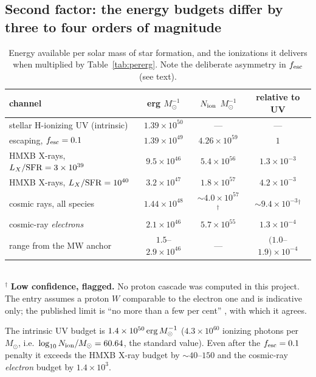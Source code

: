 \documentclass[11pt,a4paper]{article}
\begin{document}
\subsection{Second factor: the energy budgets differ by three to four orders of
magnitude}

\begin{table}[htbp]
\centering
\caption{Energy available per solar mass of star formation, and the
ionizations it delivers when multiplied by Table~\ref{tab:pererg}.
Note the deliberate asymmetry in $f_{\rm esc}$ (see text).}
\label{tab:budget}
\begin{tabular}{lccc}
\toprule
channel & erg $M_\odot^{-1}$ & $N_{\rm ion}$ $M_\odot^{-1}$ & relative to UV \\
\midrule
stellar H-ionizing UV (intrinsic)      & $1.39\times10^{50}$ & --- & --- \\
\quad escaping, $f_{\rm esc}=0.1$      & $1.39\times10^{49}$ & $4.26\times10^{59}$ & $1$ \\
HMXB X-rays, $L_X/{\rm SFR}=3\times10^{39}$ & $9.5\times10^{46}$ & $5.4\times10^{56}$ & $1.3\times10^{-3}$ \\
HMXB X-rays, $L_X/{\rm SFR}=10^{40}$   & $3.2\times10^{47}$ & $1.8\times10^{57}$ & $4.2\times10^{-3}$ \\
cosmic rays, all species               & $1.44\times10^{48}$ & $\sim4.0\times10^{57}$$^{\dagger}$ & $\sim9.4\times10^{-3}$$^{\dagger}$ \\
cosmic-ray \emph{electrons}            & $2.1\times10^{46}$ & $5.7\times10^{55}$ & $1.3\times10^{-4}$ \\
\quad range from the MW anchor         & $1.5$--$2.9\times10^{46}$ & --- & $(1.0$--$1.9)\times10^{-4}$ \\
\bottomrule
\end{tabular}\\[2pt]
{\footnotesize $^{\dagger}$ \textbf{Low confidence, flagged.} No proton cascade
was computed in this project. The entry assumes a proton $W$ comparable to the
electron one and is indicative only; the published limit is ``no more than a
few per cent'' \citep{sazonov15,leite17}, with which it agrees.}
\end{table}

The intrinsic UV budget is $1.4\times10^{50}\,{\rm erg}\,M_\odot^{-1}$
($4.3\times10^{60}$ ionizing photons per $M_\odot$, i.e.\
$\log_{10}N_{\rm ion}/M_\odot = 60.64$, the standard value). Even after the
$f_{\rm esc}=0.1$ penalty it exceeds the HMXB X-ray budget by $\sim40$--$150$
and the cosmic-ray \emph{electron} budget by $1.4\times10^{3}$.
\end{document}
